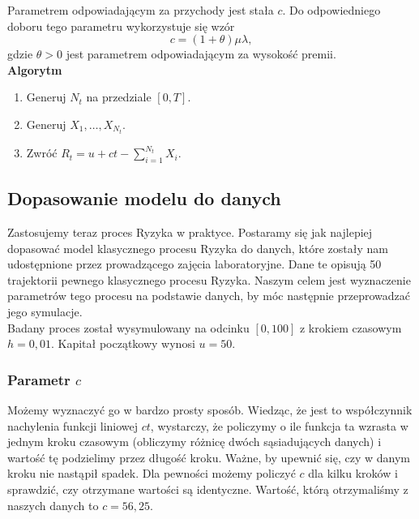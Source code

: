 \documentclass[12pt]{mwart}
\begin{document}
	\noindent Parametrem odpowiadającym za przychody jest stała $c$. Do odpowiedniego doboru tego parametru wykorzystuje się wzór
	$$ c = (1 + \theta)\mu\lambda, $$
	gdzie $\theta > 0$ jest parametrem odpowiadającym za wysokość premii.\\
	
	\noindent \textbf{Algorytm}
	\begin{enumerate}
		\item Generuj $N_t$ na przedziale $[0, T]$.
		\item Generuj $X_1, \dots, X_{N_t}$.
		\item Zwróć $R_t = u + ct - \sum\limits_{i=1}^{N_t} X_i$.
	\end{enumerate}
	
	
	
	\subsection{Dopasowanie modelu do danych}
	
	\noindent Zastosujemy teraz proces Ryzyka w praktyce. Postaramy się jak najlepiej dopasować model klasycznego procesu Ryzyka do danych, które zostały nam udostępnione przez prowadzącego zajęcia laboratoryjne. Dane te opisują 50 trajektorii pewnego klasycznego procesu Ryzyka. Naszym celem jest wyznaczenie parametrów tego procesu na podstawie danych, by móc następnie przeprowadzać jego symulacje.\vspace{2mm}\\
	Badany proces został wysymulowany na odcinku $[0, 100]$ z krokiem czasowym $h = 0,01$. Kapitał początkowy wynosi $u = 50$.
	
	\subsubsection{Parametr {\boldmath $c$}}
	\noindent Możemy wyznaczyć go w bardzo prosty sposób. Wiedząc, że jest to współczynnik nachylenia funkcji liniowej $ct$, wystarczy, że policzymy o ile funkcja ta wzrasta w jednym kroku czasowym (obliczymy różnicę dwóch sąsiadujących danych) i wartość tę podzielimy przez długość kroku. Ważne, by upewnić się, czy w danym kroku nie nastąpił spadek. Dla pewności możemy policzyć $c$ dla kilku kroków i sprawdzić, czy otrzymane wartości są identyczne. Wartość, którą otrzymaliśmy z naszych danych to $c = 56,25$.
	
\end{document}
